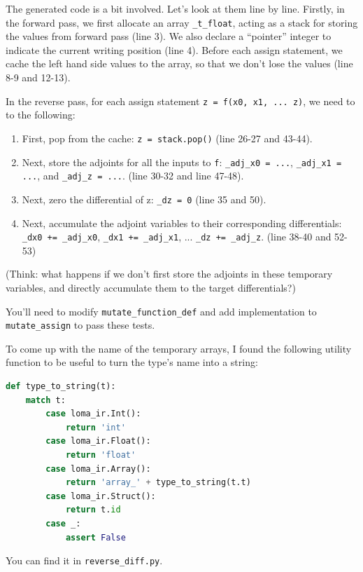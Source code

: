 The generated code is a bit involved. Let's look at them line by line. Firstly, in the forward pass, we
first allocate an array \lstinline{_t_float}, acting as a stack for storing the values from forward pass (line 3). We also declare a ``pointer'' integer to indicate the current writing position (line 4). Before each assign statement, we cache the left hand side values to the array, so that we don't lose the values (line 8-9 and 12-13).

In the reverse pass, for each assign statement \lstinline{z = f(x0, x1, ... z)}, we need to to the following:
\begin{enumerate}
	\item First, pop from the cache: \lstinline{z = stack.pop()} (line 26-27 and 43-44).
	\item Next, store the adjoints for all the inputs to \lstinline{f}: \lstinline{_adj_x0 = ...}, \lstinline{_adj_x1 = ...}, and \lstinline{_adj_z = ...}. (line 30-32 and line 47-48).
	\item Next, zero the differential of z: \lstinline{_dz = 0} (line 35 and 50).
	\item Next, accumulate the adjoint variables to their corresponding differentials: \lstinline{_dx0 += _adj_x0}, \lstinline{_dx1 += _adj_x1}, ... \lstinline{_dz += _adj_z}. (line 38-40 and 52-53)
\end{enumerate}
(Think: what happens if we don't first store the adjoints in these temporary variables, and directly accumulate them to the target differentials?)

You'll need to modify \lstinline{mutate_function_def} and add implementation to \lstinline{mutate_assign} to pass these tests.

To come up with the name of the temporary arrays, I found the following utility function to be useful to turn the type's name into a string:
\begin{lstlisting}[language=Python]
def type_to_string(t):
    match t:
        case loma_ir.Int():
            return 'int'
        case loma_ir.Float():
            return 'float'
        case loma_ir.Array():
            return 'array_' + type_to_string(t.t)
        case loma_ir.Struct():
            return t.id
        case _:
            assert False
\end{lstlisting}
You can find it in \lstinline{reverse_diff.py}.

